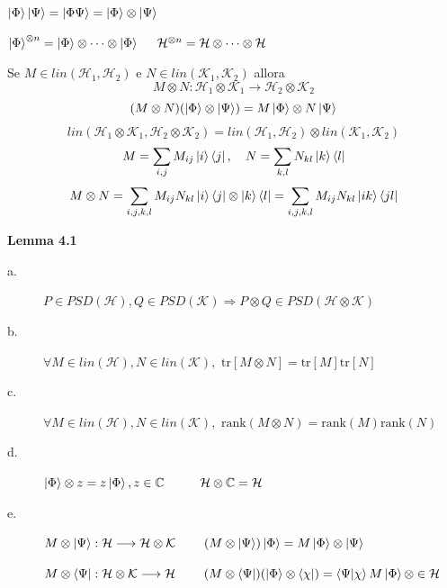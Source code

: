 \medskip
$\ket{\Phi}\ket{\Psi} = \ket{\Phi\Psi} = \ket{\Phi} \otimes \ket{\Psi}$

\medskip
$\ket{\Phi} ^{\otimes n} = \ket{\Phi} \otimes \dots \otimes \ket{\Phi} \hspace{0.5cm} \mathcal{H}^{\otimes n} = \mathcal{H} \otimes\dots\otimes\mathcal{H}$

\medskip
Se $M \in \textit{lin}(\mathcal{H}_1,\mathcal{H}_2)$ e $N \in \textit{lin}(\mathcal{K}_1,\mathcal{K}_2)$ allora
$$M\otimes N : \mathcal{H}_1 \otimes \mathcal{K}_1 \longrightarrow \mathcal{H}_2 \otimes \mathcal{K}_2 $$
$$(M \otimes N) (\ket{ \Phi} \otimes \ket{\Psi}) = M\ket{\Phi} \otimes N \ket{\Psi}$$
$$\textit{lin}(\mathcal{H}_1\otimes\mathcal{K}_1,\mathcal{H}_2\otimes\mathcal{K}_2) = \textit{lin}(\mathcal{H}_1,\mathcal{H}_2) \otimes \textit{lin}(\mathcal{K}_1,\mathcal{K}_2)$$
$$M = \sum_{i,j}M_{ij}\ket{i}\bra{j}, \quad N = \sum_{k,l} N_{kl} \ket{k}\bra{l}$$
$$M \otimes N = \sum_{i,j,k,l} M_{ij} N_{kl}\ket{i}\bra{j} \otimes \ket{k}\bra{l} = \sum_{i,j,k,l} M_{ij} N_{kl}\ket{ik}\bra{jl}$$

\textbf{Lemma 4.1}
\begin{description}
	\item[a.] $P \in \textit{PSD}(\mathcal{H}), Q \in \textit{PSD}(\mathcal{K}) \Rightarrow P \otimes Q \in \textit{PSD}(\mathcal{H}\otimes\mathcal{K})$
	\item[b.] $\forall M \in \textit{lin}(\mathcal{H}), N \in \textit{lin}(\mathcal{K}), \text{ tr}[M\otimes N] = \text{tr}[M]\text{tr}[N]$
	\item[c.] $\forall M \in \textit{lin}(\mathcal{H}), N \in \textit{lin}(\mathcal{K}), \text{ rank}(M\otimes N) = \text{rank}(M)\text{rank}(N)$
	\item[d.] $\ket{\Phi}\otimes z = z\ket{\Phi}, z \in \mathbb{C} \hspace{1cm}\mathcal{H} \otimes \mathbb{C}= \mathcal{H}$
	\item[e.] $M\otimes \ket{\Psi}: \mathcal{H} \longrightarrow \mathcal{H} \otimes \mathcal{K} \hspace{0.8cm} (M\otimes \ket{\Psi})\ket{\Phi} = M \ket{\Phi} \otimes \ket{\Psi}$
	
	\medskip
	$M\otimes \bra{\Psi}: \mathcal{H} \otimes \mathcal{K} \longrightarrow \mathcal{H} \hspace{0.8cm} (M\otimes \bra{\Psi}) (\ket{\Phi}\otimes\bra{\chi}) = \braket{\Psi|\chi} M \ket{\Phi} \otimes \in \mathcal{H}$
\end{description}

